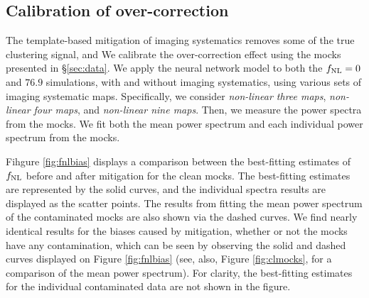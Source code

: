 \subsection{Calibration of over-correction}\label{ssec:calibration}

The template-based mitigation of imaging systematics removes some of the true clustering signal, and   We calibrate the over-correction effect using the mocks presented in \S \ref{sec:data}.   We apply the neural network model to both the $f_{\rm NL}=0$ and $76.9$ simulations, with and without imaging systematics, using various sets of imaging systematic maps. Specifically, we consider \textit{non-linear three maps}, \textit{non-linear four maps}, and \textit{non-linear nine maps}. Then, we measure the power spectra from the mocks. We fit both the mean power spectrum and each individual power spectrum from the mocks. 

Fihgure \ref{fig:fnlbias} displays a comparison between the best-fitting estimates of $f_{\rm NL}$ before and after mitigation for the clean mocks. The best-fitting estimates  are represented by the solid curves, and the individual spectra results are displayed as the scatter points. The results from fitting the mean power spectrum of the contaminated mocks are also shown via the dashed curves. We find nearly identical results for the biases caused by mitigation, whether or not the mocks have any contamination, which can be seen by observing the solid and dashed curves displayed on Figure \ref{fig:fnlbias} (see, also, Figure \ref{fig:clmocks}, for a comparison of the mean power spectrum). For clarity, the best-fitting estimates for the individual contaminated data are not shown in the figure.

